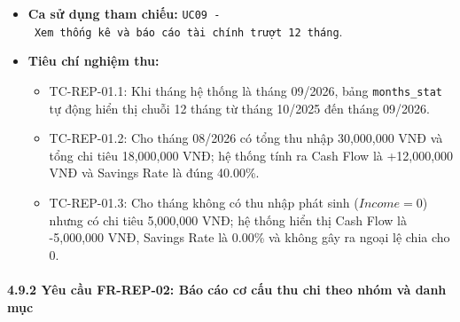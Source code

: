 \documentclass[11pt,a4paper]{article}
\providecommand{\tightlist}{
  \setlength{\itemsep}{0pt}\setlength{\parskip}{0pt}}
\begin{document}
\begin{itemize}
  \begin{itemize}
  \tightlist
  \item
    Bảng thống kê \texttt{months\_stat} gồm 12 dòng, các cột: Tháng
    (\texttt{month}), Thu nhập (\texttt{income}), Chi tiêu
    (\texttt{expense}), Dòng tiền ròng (\texttt{cash\ flow}), Tỷ lệ tiết
    kiệm (\texttt{savings\ rate}).
  \item
    Dữ liệu chuỗi thời gian sẵn sàng cung cấp cho biểu đồ xu hướng dòng
    tiền.
  \end{itemize}
\item
  \textbf{Ca sử dụng tham chiếu:}
  \texttt{UC09\ -\ Xem\ thống\ kê\ và\ báo\ cáo\ tài\ chính\ trượt\ 12\ tháng}.
\item
  \textbf{Tiêu chí nghiệm thu:}

  \begin{itemize}
  \tightlist
  \item
    TC-REP-01.1: Khi tháng hệ thống là tháng 09/2026, bảng
    \texttt{months\_stat} tự động hiển thị chuỗi 12 tháng từ tháng
    10/2025 đến tháng 09/2026.
  \item
    TC-REP-01.2: Cho tháng 08/2026 có tổng thu nhập 30,000,000 VNĐ và
    tổng chi tiêu 18,000,000 VNĐ; hệ thống tính ra Cash Flow là
    +12,000,000 VNĐ và Savings Rate là đúng 40.00\%.
  \item
    TC-REP-01.3: Cho tháng không có thu nhập phát sinh (\(Income = 0\))
    nhưng có chi tiêu 5,000,000 VNĐ; hệ thống hiển thị Cash Flow là
    -5,000,000 VNĐ, Savings Rate là 0.00\% và không gây ra ngoại lệ chia
    cho 0.
  \end{itemize}
\end{itemize}

\paragraph{4.9.2 Yêu cầu FR-REP-02: Báo cáo cơ cấu thu chi theo nhóm và
danh
mục}\label{492-yuxeau-cux1ea7u-fr-rep-02-buxe1o-cuxe1o-cux1a1-cux1ea5u-thu-chi-theo-nhuxf3m-vuxe0-danh-mux1ee5c}
\end{document}
